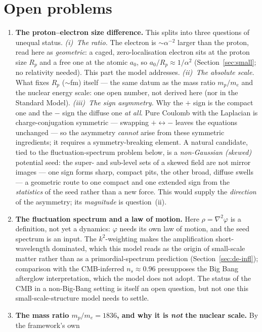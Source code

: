 \documentclass[11pt]{article}
\newcommand{\grad}{\nabla}
\begin{document}
\section{Open problems}\label{sec:open}
\begin{enumerate}
\item \textbf{The proton--electron size difference.} This splits into three questions of unequal status.
\emph{(i)~The ratio.} The electron is ${\sim}\alpha^{-2}$ larger than the proton, read here as \emph{geometric}: a
caged, zero-localisation electron sits at the proton size $R_p$ and a free one at the atomic $a_0$, so
$a_0/R_p\approx1/\alpha^2$ (Section~\ref{sec:small}; no relativity needed). This part the model addresses.
\emph{(ii)~The absolute scale.} What fixes $R_p$ (${\sim}$fm) itself --- the same datum as the mass ratio
$m_p/m_e$ and the nuclear energy scale: one open number, not derived here (nor in the Standard Model).
\emph{(iii)~The sign asymmetry.} Why the $+$ sign is the compact one and the $-$ sign the diffuse one \emph{at
all}. Pure Coulomb with the Laplacian is charge-conjugation symmetric --- swapping $+\leftrightarrow-$ leaves the
equations unchanged --- so the asymmetry \emph{cannot} arise from these symmetric ingredients; it requires a
symmetry-breaking element. A natural candidate, tied to the fluctuation-spectrum problem below, is a
\emph{non-Gaussian (skewed)} potential seed: the super- and sub-level sets of a skewed field are not mirror images
--- one sign forms sharp, compact pits, the other broad, diffuse swells --- a geometric route to one compact and
one extended sign from the \emph{statistics} of the seed rather than a new force. This would supply the
\emph{direction} of the asymmetry; its \emph{magnitude} is question~(ii).
\item \textbf{The fluctuation spectrum and a law of motion.} Here $\rho=\grad^2\varphi$ is a definition, not yet a
dynamics: $\varphi$ needs its own law of motion, and the seed spectrum is an input. The $k^2$-weighting makes the
amplification short-wavelength dominated, which this model reads as the origin of small-scale matter rather than as
a primordial-spectrum prediction (Section~\ref{sec:de-infl}); comparison with the CMB-inferred $n_s\approx0.96$
presupposes the Big Bang afterglow interpretation, which the model does not adopt. The status of the CMB in a
non-Big-Bang setting is itself an open question, but not one this small-scale-structure model needs to settle.
\item \textbf{The mass ratio $m_p/m_e=1836$, and why it is \emph{not} the nuclear scale.} By the framework's own

\end{enumerate}
\end{document}
